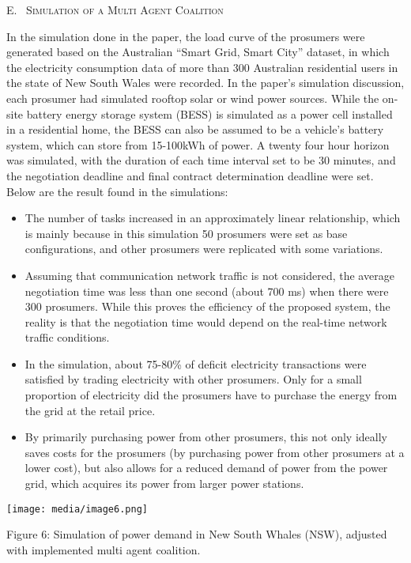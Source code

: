 \documentclass[
]{article}
\begin{document}
E.~ \textsc{Simulation of a Multi Agent Coalition}

In the simulation done in the paper, the load curve of the prosumers
were generated based on the Australian ``Smart Grid, Smart City''
dataset, in which the electricity consumption data of more than 300
Australian residential users in the state of New South Wales were
recorded. In the paper's simulation discussion, each prosumer had
simulated rooftop solar or wind power sources. While the on-site battery
energy storage system (BESS) is simulated as a power cell installed in a
residential home, the BESS can also be assumed to be a vehicle's battery
system, which can store from 15-100kWh of power. A twenty four hour
horizon was simulated, with the duration of each time interval set to be
30 minutes, and the negotiation deadline and final contract
determination deadline were set. Below are the result found in the
simulations:

\begin{itemize}
\item
  The number of tasks increased in an approximately linear relationship,
  which is mainly because in this simulation 50 prosumers were set as
  base configurations, and other prosumers were replicated with some
  variations.
\item
  Assuming that communication network traffic is not considered, the
  average negotiation time was less than one second (about 700 ms) when
  there were 300 prosumers. While this proves the efficiency of the
  proposed system, the reality is that the negotiation time would depend
  on the real-time network traffic conditions.
\item
  In the simulation, about 75-80\% of deficit electricity transactions
  were satisfied by trading electricity with other prosumers. Only for a
  small proportion of electricity did the prosumers have to purchase the
  energy from the grid at the retail price.
\item
  By primarily purchasing power from other prosumers, this not only
  ideally saves costs for the prosumers (by purchasing power from other
  prosumers at a lower cost), but also allows for a reduced demand of
  power from the power grid, which acquires its power from larger power
  stations.
\end{itemize}

\texttt{[image: media/image6.png]}

Figure 6: Simulation of power demand in New South Whales (NSW), adjusted
with implemented multi agent coalition.
\end{document}
